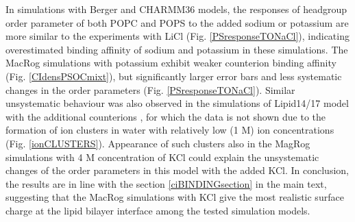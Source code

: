 \documentclass[journal=jpcbfk]{achemso}
\begin{document}
In simulations with Berger and CHARMM36 models, the responses of headgroup order parameter
of both POPC and POPS to the added sodium or potassium are more similar to the experiments
with LiCl (Fig. \ref{PSresponseTONaCl}), indicating overestimated binding affinity of sodium and potassium 
in these simulations. The MacRog simulations with potassium exhibit weaker counterion binding affinity
(Fig. \ref{CIdensPSOCmixt}), but significantly larger error bars and
less systematic changes in the order parameters (Fig. \ref{PSresponseTONaCl}).
Similar unsystematic behaviour was also observed in the simulations of Lipid14/17 model
with the additional counterions \cite{POPCpopsLIPID17withKCI,POPCpopsLIPID17withK,POPCpopsLIPID17withNaCI,POPCpopsLIPID17withNa},
for which the data is not shown due to the formation of
ion clusters in water with relatively low (1 M) ion concentrations (Fig. \ref{ionCLUSTERS}).
Appearance of such clusters also in the MagRog simulations with 4 M concentration of KCl
could explain the unsystematic changes of the order parameters in this model with the added KCl.
In conclusion, the results are in line with the section \ref{ciBINDINGsection}
in the main text, suggesting that the MacRog simulations with KCl give the most
realistic surface charge at the lipid bilayer interface among the tested simulation models.
\end{document}
